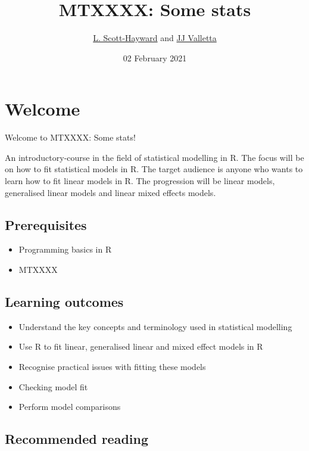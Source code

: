 \documentclass[
  oneside]{krantz}
\title{MTXXXX: Some stats}
\author{\href{lass@st-andrews.ac.uk}{L. Scott-Hayward} and \href{jjv1@st-andrews.ac.uk}{JJ Valletta}}
\date{02 February 2021}
\providecommand{\tightlist}{%
  \setlength{\itemsep}{0pt}\setlength{\parskip}{0pt}}
\theoremstyle{definition}
\theoremstyle{definition}
\theoremstyle{definition}
\theoremstyle{remark}
\begin{document}
\maketitle

{
\hypersetup{linkcolor=}
\setcounter{tocdepth}{2}
\tableofcontents
}
\hypertarget{welcome}{%
\chapter*{Welcome}\label{welcome}}


Welcome to MTXXXX: Some stats!

An introductory-course in the field of statistical modelling in R. The focus will be on how to fit statistical models in R. The target audience is anyone who wants to learn how to fit linear models in R. The progression will be linear models, generalised linear models and linear mixed effects models.

\hypertarget{prerequisites}{%
\section*{Prerequisites}\label{prerequisites}}


\begin{itemize}
\tightlist
\item
  Programming basics in R
\item
  MTXXXX
\end{itemize}

\hypertarget{learning-outcomes}{%
\section*{Learning outcomes}\label{learning-outcomes}}


\begin{itemize}
\tightlist
\item
  Understand the key concepts and terminology used in statistical modelling
\item
  Use R to fit linear, generalised linear and mixed effect models in R
\item
  Recognise practical issues with fitting these models
\item
  Checking model fit
\item
  Perform model comparisons
\end{itemize}

\hypertarget{recommended-reading}{%
\section*{Recommended reading}\label{recommended-reading}}
\end{document}
